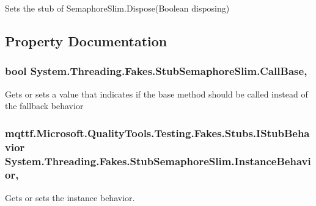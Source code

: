 Sets the stub of Semaphore\-Slim.\-Dispose(\-Boolean disposing)



\subsection{Property Documentation}
\hypertarget{class_system_1_1_threading_1_1_fakes_1_1_stub_semaphore_slim_a6e5c263badc5b89c71ba3e836cdbee62}{
\subsubsection[{Call\-Base}]{\setlength{\rightskip}{0pt plus 5cm}bool System.\-Threading.\-Fakes.\-Stub\-Semaphore\-Slim.\-Call\-Base\hspace{0.3cm}{\ttfamily [get]}, {\ttfamily [set]}}}\label{class_system_1_1_threading_1_1_fakes_1_1_stub_semaphore_slim_a6e5c263badc5b89c71ba3e836cdbee62}


Gets or sets a value that indicates if the base method should be called instead of the fallback behavior

\hypertarget{class_system_1_1_threading_1_1_fakes_1_1_stub_semaphore_slim_af696848a443d6be27f81f682e8a6b542}{
\subsubsection[{Instance\-Behavior}]{\setlength{\rightskip}{0pt plus 5cm}mqttf.\-Microsoft.\-Quality\-Tools.\-Testing.\-Fakes.\-Stubs.\-I\-Stub\-Behavior System.\-Threading.\-Fakes.\-Stub\-Semaphore\-Slim.\-Instance\-Behavior\hspace{0.3cm}{\ttfamily [get]}, {\ttfamily [set]}}}\label{class_system_1_1_threading_1_1_fakes_1_1_stub_semaphore_slim_af696848a443d6be27f81f682e8a6b542}


Gets or sets the instance behavior.


